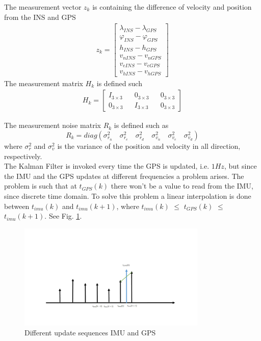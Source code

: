 The measurement vector $z_k$ is containing the difference of velocity and position from the INS and GPS
\begin{align}
z_k =
\begin{bmatrix}
\lambda_{INS} - \lambda_{GPS} \\
\varphi_{INS} - \varphi_{GPS} \\
h_{INS} - h_{GPS} \\
v_{nINS} - v_{nGPS} \\
v_{eINS} - v_{eGPS} \\
v_{hINS} - v_{hGPS}
\end{bmatrix}
\end{align}
The measurement matrix $H_k$ is defined such
\begin{align}
H_k = 
\begin{bmatrix}
I_{3\times 3} && 0_{3 \times 3} && 0_{3 \times 3} \\
0_{3 \times 3} && I_{3\times 3} && 0_{3 \times 3}
\end{bmatrix}
\end{align}

The measurement noise matrix $R_k$ is defined such as 
\begin{equation}
R_k = diag(\sigma_{r_n}^2 \quad \sigma_{r_e}^2 \quad \sigma_{r_d}^2 \quad \sigma_{v_n}^2 \quad \sigma_{v_e}^2 \quad \sigma_{v_d}^2)
\end{equation}
where $\sigma_{r}^2$ and $\sigma_{v}^2$ is the variance of the position and velocity in all direction, respectively.\\

The Kalman Filter is invoked every time the GPS is updated, i.e. $1Hz$, but since the IMU and the GPS updates at different frequencies a problem arises. The problem is such that at $t_{GPS}(k)$ there won't be a value to read from the IMU, since discrete time domain. To solve this problem a linear interpolation is done between $t_{imu}(k)$ and $t_{imu}(k+1)$, where $t_{imu}(k)$ $\leq$ $t_{GPS}(k)$ $\leq$  $t_{imu}(k+1)$. See Fig. \ref{Fig.different_update}.
\begin{figure}[H]
\centering
\includegraphics[width=0.8\textwidth]{Figures/linear.pdf}
\caption{Different update sequences IMU and GPS}
\label{Fig.different_update}
\end{figure}

